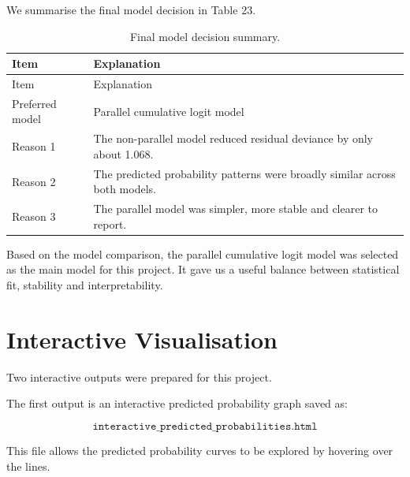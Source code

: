\documentclass{article}
\begin{document}
We summarise the final model decision in Table 23.

\begin{longtable}[]{@{}
  >{\raggedright\arraybackslash}p{}
  >{\raggedright\arraybackslash}p{}@{}}
\caption{Final model decision summary.}\tabularnewline
\toprule\noalign{}
\begin{minipage}[b]{\linewidth}\raggedright
Item
\end{minipage} & \begin{minipage}[b]{\linewidth}\raggedright
Explanation
\end{minipage} \\
\midrule\noalign{}
\endfirsthead
\toprule\noalign{}
\begin{minipage}[b]{\linewidth}\raggedright
Item
\end{minipage} & \begin{minipage}[b]{\linewidth}\raggedright
Explanation
\end{minipage} \\
\midrule\noalign{}
\endhead
\bottomrule\noalign{}
\endlastfoot
Preferred model & Parallel cumulative logit model \\
Reason 1 & The non-parallel model reduced residual deviance by only
about 1.068. \\
Reason 2 & The predicted probability patterns were broadly similar
across both models. \\
Reason 3 & The parallel model was simpler, more stable and clearer to
report. \\
\end{longtable}

Based on the model comparison, the parallel cumulative logit model was
selected as the main model for this project. It gave us a useful balance
between statistical fit, stability and interpretability.

\section{Interactive Visualisation}\label{interactive-visualisation}

Two interactive outputs were prepared for this project.

The first output is an interactive predicted probability graph saved as:

\[
\texttt{interactive\_predicted\_probabilities.html}
\]

This file allows the predicted probability curves to be explored by
hovering over the lines.
\end{document}
